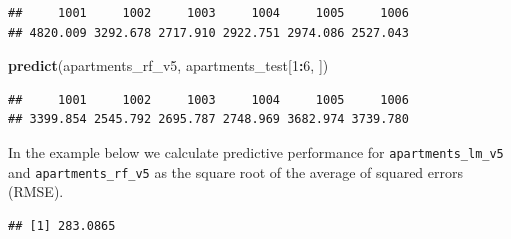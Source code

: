 \documentclass[12pt,]{krantz}
\newenvironment{Shaded}{\begin{snugshade}}{\end{snugshade}}
\newcommand{\DecValTok}[1]{\textcolor[rgb]{0.00,0.00,0.81}{#1}}
\newcommand{\KeywordTok}[1]{\textcolor[rgb]{0.13,0.29,0.53}{\textbf{#1}}}
\newcommand{\NormalTok}[1]{#1}
\newcommand{\OperatorTok}[1]{\textcolor[rgb]{0.81,0.36,0.00}{\textbf{#1}}}
\newcommand{\StringTok}[1]{\textcolor[rgb]{0.31,0.60,0.02}{#1}}
\begin{document}
\begin{verbatim}
##     1001     1002     1003     1004     1005     1006 
## 4820.009 3292.678 2717.910 2922.751 2974.086 2527.043
\end{verbatim}

\begin{Shaded}
\begin{Highlighting}[]
\KeywordTok{predict}\NormalTok{(apartments\_rf\_v5, apartments\_test[}\DecValTok{1}\OperatorTok{:}\DecValTok{6}\NormalTok{, ])}
\end{Highlighting}
\end{Shaded}

\begin{verbatim}
##     1001     1002     1003     1004     1005     1006 
## 3399.854 2545.792 2695.787 2748.969 3682.974 3739.780
\end{verbatim}

In the example below we calculate predictive performance for \texttt{apartments\_lm\_v5} and \texttt{apartments\_rf\_v5} as the square root of the average of squared errors (RMSE).

\begin{Shaded}
\end{Shaded}

\begin{verbatim}
## [1] 283.0865
\end{verbatim}

\begin{Shaded}
\end{Shaded}
\end{document}
